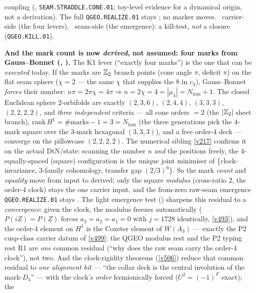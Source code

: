 coupling (, \texttt{SEAM.STRADDLE.CONE.01}; toy-level
evidence for a dynamical origin, not a derivation).
The full \texttt{QGEO.REALIZE.01} stays \mO;
no marker moves. \mE\ carrier-side (the four
levers), \mO\ seam-side (the emergence): a kill-test, \emph{not} a closure (\texttt{QGEO.KILL.01}).
\par\smallskip\noindent\textbf{And the mark count is now \emph{derived}, not assumed: four marks from
Gauss--Bonnet (, ).} The K1 lever
(``exactly four marks'') is the one that can be \emph{executed} today. If the marks are $\mathbb Z_2$ branch points
(cone angle $\pi$, deficit $\pi$) on the flat seam sphere ($\chi{=}2$ --- the same $\chi$ that supplies the
$8$ in $c_3$), Gauss--Bonnet \emph{forces} their number: $n\pi=2\pi\chi=4\pi\Rightarrow
n=2\chi=4=|\mu_4|=N_{\mathrm{fam}}{+}1$. The closed Euclidean sphere $2$-orbifolds are exactly
$(2,3,6)$, $(2,4,4)$, $(3,3,3)$, $(2,2,2,2)$, and \emph{three independent} criteria --- all cone orders $=2$ (the
$|\mathbb Z_2|$ sheet branch), $\mathrm{rank}\,H^1=\#\text{marks}-1=3=N_{\mathrm{fam}}$ (the three generations pick
the $4$-mark square over the $3$-mark hexagonal $(3,3,3)$), and a free order-$4$ deck --- converge on the
pillowcase $(2,2,2,2)$. The numerical sibling \vref{v217} confirms it on the actual DtN/state: scanning the
number $n$ \emph{and} the positions freely, the $4$-equally-spaced (square) configuration is the unique joint
minimiser of \{clock-invariance, $3$-family cohomology, transfer gap $(2/3)^6$\}. So the mark \emph{count}
and \emph{equality} move from input to derived; only the square \emph{modulus} (cross-ratio $2$, the order-$4$
clock) stays the one carrier input, and the from-zero raw-seam emergence \texttt{QGEO.REALIZE.01} stays \mO.
The light emergence test () sharpens this residual to a
\emph{convergence}: given the clock, the modulus freezes automatically ($P(iZ)=P(Z)$ forces
$a_3=a_2=a_1=0$ with $j=1728$ identically, \vref{v493}), and the order-$4$ element on $H^1$ is the
Coxeter element of $W(A_3)$ --- exactly the P2 cusp-class carrier datum of \vref{v499}: the QGEO
modulus rest and the P2 typing rest R1 are \emph{one} common residual (``why does the raw seam carry
the order-$4$ clock''), not two. And the clock-rigidity theorems (\vref{v506}) reduce that common
residual to \emph{one alignment bit} --- ``the collar deck is the central involution of the
mark-$D_4$'' --- with the clock's \emph{order} fermionically forced ($U^2=(-1)^F$ exact); the
